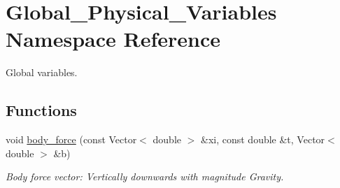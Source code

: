 \hypertarget{namespaceGlobal__Physical__Variables}{}\section{Global\+\_\+\+Physical\+\_\+\+Variables Namespace Reference}
\label{namespaceGlobal__Physical__Variables}


Global variables.  


\subsection*{Functions}
\begin{DoxyCompactItemize}
\item 
void \hyperlink{namespaceGlobal__Physical__Variables_a055c27a8d2375f73e74970a8ea1dee21}{body\+\_\+force} (const Vector$<$ double $>$ \&xi, const double \&t, Vector$<$ double $>$ \&b)
\begin{DoxyCompactList}\small\item\em Body force vector\+: Vertically downwards with magnitude Gravity. \end{DoxyCompactList}\end{DoxyCompactItemize}
